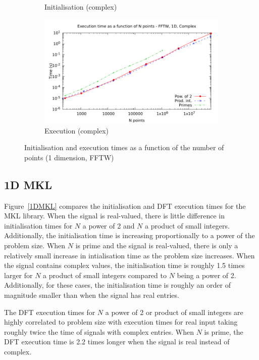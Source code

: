 \documentclass[12pt, a4paper]{article} \setlength{\textheight}{24cm}
\begin{document}
\begin{figure}[htb]
\begin{subfigure}{.5\textwidth}
    \caption{Initialisation (complex)}
    \label{1DFFTWCI}
  \end{subfigure}%
  \begin{subfigure}{.5\textwidth}
    \centering
    \includegraphics[width=.9\linewidth]{graphs/1d-fftw-exec-c.pdf}
    \caption{Execution (complex)}
    \label{1DFFTWC}
  \end{subfigure}
  \caption{Initialisation and execution times as a function of the
    number of points (1 dimension, FFTW)}
  \label{1DFFTW}
\end{figure}

\subsection{1D MKL}
Figure~\ref{1DMKL} compares the initialisation and DFT execution times
for the MKL library. When the signal is real-valued, there is little
difference in initialisation times for $N$ a power of 2 and $N$ a
product of small integers. Additionally, the initialisation time is
increasing proportionally to a power of the problem size. When $N$ is
prime and the signal is real-valued, there is only a relatively small
increase in intialisation time as the problem size increases. When the
signal contains complex values, the initialisation time is roughly 1.5
times larger for $N$ a product of small integers compared to $N$ being
a power of 2. Additionally, for these cases, the initialisation time
is roughly an order of magnitude smaller than when the signal has real
entries.

The DFT execution times for $N$ a power of 2 or product of small
integers are highly correlated to problem size with execution times
for real input taking roughly twice the time of signals with complex
entries. When $N$ is prime, the DFT execution time is 2.2 times longer
when the signal is real instead of complex.
\end{document}
